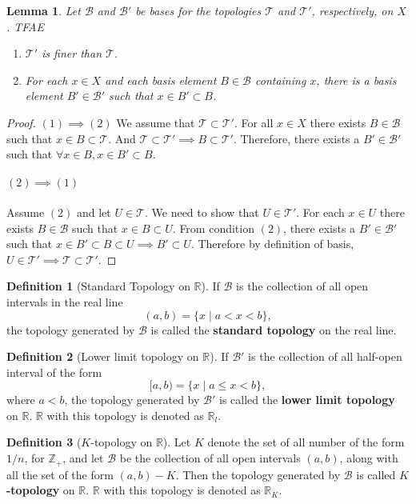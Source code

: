\documentclass[12pt,reqno]{amsart}
\theoremstyle{plain}
\newtheorem{lem}{Lemma}
\theoremstyle{definition}
\newtheorem{defn}{Definition}
\begin{document}
\begin{lem}
    Let $\mathcal{B}$ and $\mathcal{B}'$ be bases for the topologies $\mathcal{T}$ and $\mathcal{T}'$, respectively, on $X$. TFAE
    \begin{enumerate}
        \item $\mathcal{T}'$ is finer than $\mathcal{T}.$
        \item For each $x \in X$ and each basis element $B \in \mathcal{B}$ containing $x$, there is a basis element $B' \in \mathcal{B}'$ such that $x \in B' \subset B$.
    \end{enumerate}
\end{lem}
\begin{proof}
    $(1) \implies (2)$ We assume that $\mathcal{T} \subset \mathcal{T}'.$ For all $x \in X$ there exists $B \in \mathcal{B}$ such that $x \in B \subset \mathcal{T}$. And $\mathcal{T} \subset \mathcal{T}' \implies B \subset \mathcal{T}'$. Therefore, there exists a $B' \in \mathcal{B}'$ such that $ \forall x \in B, x \in B' \subset B$.
    \paragraph{$(2) \implies (1)$} Assume $(2)$ and let $U \in \mathcal{T}$. We need to show that $U \in \mathcal{T}'$. For each $x \in U$ there exists $B \in \mathcal{B}$ such that $x \in B \subset U$. From condition $(2)$, there exists a $B' \in \mathcal{B}'$ such that $x \in B' \subset B \subset U \implies B' \subset U$. Therefore by definition of basis, $U \in \mathcal{T}' \implies \mathcal{T} \subset \mathcal{T}'$.
\end{proof}
\begin{defn}[Standard Topology on $\mathbb{R}$]
    If $\mathcal{B}$ is the collection of all open intervals in the real line
    $$ (a,b) = \{x \mid a < x < b\},$$
    the topology generated by $\mathcal{B}$ is called the {\bf standard topology} on the real line.
\end{defn}
\begin{defn}[Lower limit topology on $\mathbb{R}$]
    If $\mathcal{B}'$ is the collection of all half-open interval of the form 
    $$ [a,b) = \{x \mid a \leq x < b\},$$
    where $a < b$, the topology generated by $\mathcal{B}'$ is called the {\bf lower limit topology} on $\mathbb{R}$. $\mathbb{R}$ with this topology is denoted as $\mathbb{R}_l$.
\end{defn}
\begin{defn}[$K$-topology on $\mathbb{R}$]
    Let $K$ denote the set of all number of the form $1/n$, for $\mathbb{Z}_+$, and let $\mathcal{B}$ be the collection of all open intervals $(a,b)$, along with all the set of the form $(a,b) - K$. Then the topology generated by $\mathcal{B}$ is called {\bf $K$-topology} on $ \mathbb{R}$. $\mathbb{R}$ with this topology is denoted as $\mathbb{R}_K$.
\end{defn}
\end{document}

